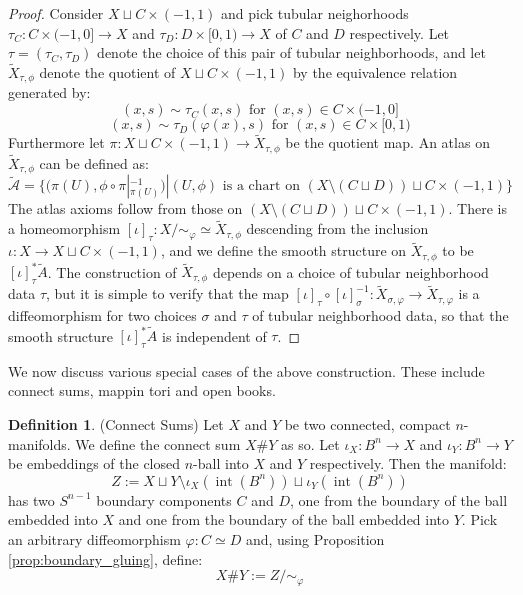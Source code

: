 \documentclass[12pt]{article}
\theoremstyle{definition}
\newtheorem{definition}[theorem]{Definition}
\numberwithin{equation}{section}
\newcommand{\op}{\operatorname}
\begin{document}
\begin{proof} Consider $X \sqcup C \times (-1,1)$ and pick tubular neighorhoods $\tau_C:C \times (-1,0] \to X$ and $\tau_D:D \times [0,1) \to X$ of $C$ and $D$ respectively. Let $\tau = (\tau_C,\tau_D)$ denote the choice of this pair of tubular neighborhoods, and let $\widetilde{X}_{\tau,\phi}$ denote the quotient of $X \sqcup C \times (-1,1)$ by the equivalence relation generated by:
\[(x,s) \sim \tau_C(x,s) \text{ for }(x,s) \in C \times (-1,0]\]
\[ (x,s) \sim \tau_D(\varphi(x),s) \text{ for }(x,s) \in C \times [0,1)\]
Furthermore let $\pi:X \sqcup C \times (-1,1) \to \widetilde{X}_{\tau,\phi}$ be the quotient map. An atlas on $\widetilde{X}_{\tau,\phi}$ can be defined as:
\[
\widetilde{\mathcal{A}} = \{(\pi(U),\phi \circ \pi|_{\pi(U)}^{-1})| (U,\phi) \text{ is a chart on }(X \setminus (C \sqcup D)) \sqcup C \times (-1,1)\}
\]
The atlas axioms follow from those on $(X \setminus (C \sqcup D)) \sqcup C \times (-1,1)$. There is a homeomorphism $[\iota]_\tau:X/\sim_\varphi \simeq \widetilde{X}_{\tau,\phi}$ descending from the inclusion $\iota:X \to X \sqcup C \times (-1,1)$, and we define the smooth structure on $\widetilde{X}_{\tau,\phi}$ to be $[\iota]^*_\tau\widetilde{A}$. The construction of $\widetilde{X}_{\tau,\phi}$ depends on a choice of tubular neighborhood data $\tau$, but it is simple to verify that the map $[\iota]_{\tau} \circ [\iota]_{\sigma}^{-1}:\widetilde{X}_{\sigma,\varphi} \to \widetilde{X}_{\tau,\varphi}$ is a diffeomorphism for two choices $\sigma$ and $\tau$ of tubular neighborhood data, so that the smooth structure $[\iota]_\tau^*\widetilde{A}$ is independent of $\tau$.
\end{proof}

We now discuss various special cases of the above construction. These include connect sums, mappin tori and open books. 

\begin{definition} (Connect Sums) Let $X$ and $Y$ be two connected, compact $n$-manifolds. We define the connect sum $X \# Y$ as so. Let $\iota_X:B^n \to X$ and $\iota_Y:B^n \to Y$ be embeddings of the closed $n$-ball into $X$ and $Y$ respectively. Then the manifold:
\[Z := X \sqcup Y \setminus \iota_X(\op{int}(B^n)) \sqcup \iota_Y(\op{int}(B^n))\]
has two $S^{n-1}$ boundary components $C$ and $D$, one from the boundary of the ball embedded into $X$ and one from the boundary of the ball embedded into $Y$. Pick an arbitrary diffeomorphism $\varphi:C \simeq D$ and, using Proposition \ref{prop:boundary_gluing}, define:
\[
X \# Y := Z/\sim_{\varphi}
\] 
\end{definition}
\end{document}
